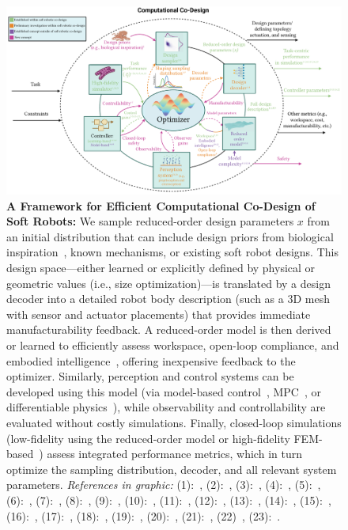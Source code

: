 \begin{figure}[h!]
    \centering
    \includegraphics[width=1\linewidth]{appendix-holistic-codesign/figures/efficient_computation_co_design_optimized.pdf}
    \caption{\textbf{A Framework for Efficient Computational Co-Design of Soft Robots:}
        We sample reduced-order design parameters $x$ from an initial distribution that can include design priors from biological inspiration~\citep{mazzolai2020vision, chen2020design, laschi2024bioinspiration}, known mechanisms, or existing soft robot designs. This design space—either learned or explicitly defined by physical or geometric values (i.e., size optimization)—is translated by a design decoder into a detailed robot body description (such as a 3D mesh with sensor and actuator placements) that provides immediate manufacturability feedback. A reduced-order model is then derived~\citep{alora2023data, stolzle2024input, valadas2025learning, alkayas2025soft} or learned to efficiently assess workspace, open-loop compliance, and embodied intelligence~\citep{cianchetti2021embodied, mengaldo2022concise, vihmar2023measure}, offering inexpensive feedback to the optimizer. Similarly, perception and control systems can be developed using this model (via model-based control~\citep{della2023model}, MPC~\citep{alora2023data}, or differentiable physics~\citep{spielberg2019learning, wang2023softzoo}), while observability and controllability are evaluated without costly simulations. Finally, closed-loop simulations (low-fidelity using the reduced-order model or high-fidelity FEM-based~\citep{coevoet2017software}) assess integrated performance metrics, which in turn optimize the sampling distribution, decoder, and all relevant system parameters.
        \emph{References in graphic:}  
        (1):~\citep{navez2024contributions}, (2):~\citep{bhatia2021evolution}, (3):~\citep{wang2023softzoo}, (4):~\citep{wang2024diffusebot}, (5):~\citep{song2024morphvae}, (6):~\citep{sutton1998reinforcement}, (7):~\citep{garnett2023bayesian}, (8):~\citep{medvet2022impact}, (9):~\citep{guan2023trimmed}, (10):~\citep{armanini2023soft}, (11):~\citep{valadas2025learning}, (12):~\citep{alkayas2025soft}, (13):~\citep{menager2023direct}, (14):~\citep{alora2023data}, (15):~\citep{spielberg2021co}, (16):~\citep{junge2022leveraging}, (17):~\citep{zheng2019controllability}, (18):~\citep{amehri2022workspace}, (19):~\citep{cianchetti2021embodied}, (20):~\citep{mengaldo2022concise}, (21):~\citep{vihmar2023measure}, (22)~\citep{spielberg2019learning}, (23):~\citep{della2023model}.
}
\end{figure}
